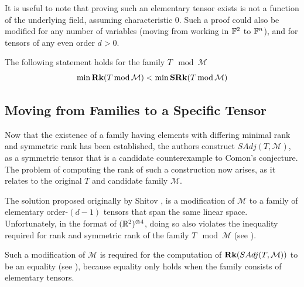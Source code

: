 \documentclass[../Lael_John_MasterThesis_Draft.tex]{subfiles}
\begin{document}
\begin{remark}
    It is useful to note that proving such an elementary tensor exists is not a function of the underlying field, assuming characteristic 0. Such a proof could also be modified for any number of variables (moving from working in $\mathbb{F}^2$ to $\mathbb{F}^n$), and for tensors of any even order $d > 0$.
\end{remark}
The following statement holds for the family $T\mod\mathcal{M}$ \begin{equation}\label{eqn:familyineq}
    \min \textbf{Rk} (T\text{\,mod\,}\mathcal{M}) < \min \textbf{SRk} (T\text{\,mod\,}\mathcal{M})
\end{equation}

\subsection*{Moving from Families to a Specific Tensor}
Now that the existence of a family having elements with differing minimal rank and symmetric rank has been established, the authors construct $SAdj(T, \mathcal{M})$, as a symmetric tensor that is a candidate counterexample to Comon's conjecture. The problem of computing the rank of such a construction now arises, as it relates to the original $T$ and candidate family $\mathcal{M}$. 

The solution proposed originally by Shitov \cite{shitov_comons_2020}, is a modification of $\mathcal{M}$ to a family of elementary order-$(d-1)$ tensors that span the same linear space. Unfortunately, in the format of $(\mathbb{R}^2)^{\otimes 4}$, doing so also violates the inequality required for rank and symmetric rank of the family $T \mod \mathcal{M}$ (see ).

Such a modification of $\mathcal{M}$ is required for the computation of $\textbf{Rk}(SAdj(T, \mathcal{M}))$ to be an equality (see ), because equality only holds when the family consists of elementary tensors. 

\end{document}
